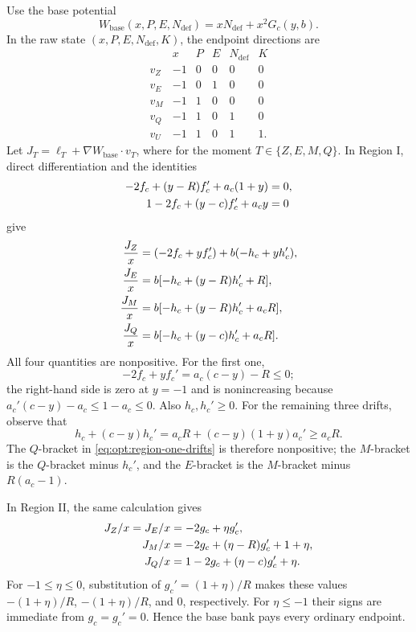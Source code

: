 Use the base potential
\begin{equation}
 W_{\mathrm{base}}(x,P,E,N_{\mathrm{def}})=xN_{\mathrm{def}}+x^2G_c(y,b).
 \label{eq:opt:base-potential}
\end{equation}
In the raw state $(x,P,E,N_{\mathrm{def}},K)$, the endpoint directions are
\begin{equation}
\begin{array}{c|ccccc}
 &x&P&E&N_{\mathrm{def}}&K\\ \hline
 v_Z&-1&0&0&0&0\\
 v_E&-1&0&1&0&0\\
 v_M&-1&1&0&0&0\\
 v_Q&-1&1&0&1&0\\
 v_U&-1&1&0&1&1.
\end{array}
 \label{eq:opt:state-directions}
\end{equation}
Let $J_T=\ell_T+\nabla W_{\mathrm{base}}\mathbin{\cdot}v_T$, where for
the moment $T\in\{Z,E,M,Q\}$.  In Region I, direct differentiation and
the identities
\begin{align}
 -2f_c+(y-R)f_c'+a_c(1+y)&=0,
 \notag\\
 1-2f_c+(y-c)f_c'+a_cy&=0
 \label{eq:opt:f-hjb-identities}
\end{align}
give
\begin{align}
 \frac{J_Z}{x}
 &=(-2f_c+yf_c')+b(-h_c+yh_c'),
 \notag\\
 \frac{J_E}{x}
 &=b[-h_c+(y-R)h_c'+R],
 \notag\\
 \frac{J_M}{x}
 &=b[-h_c+(y-R)h_c'+a_cR],
 \notag\\
 \frac{J_Q}{x}
 &=b[-h_c+(y-c)h_c'+a_cR].
 \label{eq:opt:region-one-drifts}
\end{align}
All four quantities are nonpositive.  For the first one,
\begin{equation}
 -2f_c+yf_c'=a_c(c-y)-R\le0;
 \label{eq:opt:zero-drift-sign}
\end{equation}
the right-hand side is zero at $y=-1$ and is nonincreasing because
$a_c'(c-y)-a_c\le1-a_c\le0$.  Also $h_c,h_c'\ge0$.  For the remaining
three drifts, observe that
\begin{equation}
 h_c+(c-y)h_c'
 =a_cR+(c-y)(1+y)a_c'\ge a_cR.
 \label{eq:opt:h-sign-identity}
\end{equation}
The $Q$-bracket in \eqref{eq:opt:region-one-drifts} is therefore
nonpositive; the $M$-bracket is the $Q$-bracket minus $h_c'$, and the
$E$-bracket is the $M$-bracket minus $R(a_c-1)$.

In Region II, the same calculation gives
\begin{align}
 J_Z/x=J_E/x&=-2g_c+\eta g_c',
 \notag\\
 J_M/x&=-2g_c+(\eta-R)g_c'+1+\eta,
 \notag\\
 J_Q/x&=1-2g_c+(\eta-c)g_c'+\eta.
 \label{eq:opt:region-two-drifts}
\end{align}
For $-1\le\eta\le0$, substitution of
$g_c'=(1+\eta)/R$ makes these values $-(1+\eta)/R$,
$-(1+\eta)/R$, and $0$, respectively.  For $\eta\le-1$ their signs
are immediate from $g_c=g_c'=0$.  Hence the base bank pays every
ordinary endpoint.

